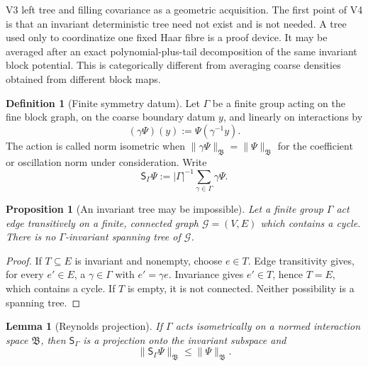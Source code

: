 \documentclass[11pt,oneside]{book}
\newtheorem{lemma}[theorem]{Lemma}
\newtheorem{proposition}[theorem]{Proposition}
\theoremstyle{definition}
\newtheorem{definition}[theorem]{Definition}
\theoremstyle{remark}
\begin{document}
V3 left tree and filling covariance as a geometric acquisition.  The
first point of V4 is that an invariant deterministic tree need not
exist and is not needed.  A tree used only to coordinatize one fixed
Haar fibre is a proof device.  It may be averaged after an exact
polynomial-plus-tail decomposition of the same invariant block
potential.  This is categorically different from averaging coarse
densities obtained from different block maps.

\begin{definition}[Finite symmetry datum]
\label{def:e8v4-symmetry}
Let \(\Gamma\) be a finite group acting on the fine block graph, on
the coarse boundary datum \(y\), and linearly on interactions by
\[
 (\gamma\Psi)(y):=\Psi(\gamma^{-1}y).
                                                        \label{eq:e8v4-action}
\]
The action is called norm isometric when
\(\|\gamma\Psi\|_{\mathfrak B}=\|\Psi\|_{\mathfrak B}\) for the
coefficient or oscillation norm under consideration.  Write
\[
 {\mathsf S}_{\Gamma}\Psi
 :=|\Gamma|^{-1}\sum_{\gamma\in\Gamma}\gamma\Psi .
                                                        \label{eq:e8v4-reynolds}
\]
\end{definition}

\begin{proposition}[An invariant tree may be impossible]
\label{prop:e8v4-no-tree}
Let a finite group \(\Gamma\) act edge transitively on a finite,
connected graph \({\mathcal G}=(V,E)\) which contains a cycle.
There is no \(\Gamma\)-invariant spanning tree of \({\mathcal G}\).
\end{proposition}

\begin{proof}
If \(T\subseteq E\) is invariant and nonempty, choose \(e\in T\).
Edge transitivity gives, for every \(e'\in E\), a
\(\gamma\in\Gamma\) with \(e'=\gamma e\).  Invariance gives
\(e'\in T\), hence \(T=E\), which contains a cycle.  If \(T\) is
empty, it is not connected.  Neither possibility is a spanning tree.
\end{proof}

\begin{lemma}[Reynolds projection]
\label{lem:e8v4-reynolds}
If \(\Gamma\) acts isometrically on a normed interaction space
\({\mathfrak B}\), then \({\mathsf S}_{\Gamma}\) is a projection onto
the invariant subspace and
\[
 \|{\mathsf S}_{\Gamma}\Psi\|_{\mathfrak B}
 \leq \|\Psi\|_{\mathfrak B}.                         \label{eq:e8v4-reynolds-bound}
\]
\end{lemma}
\end{document}
